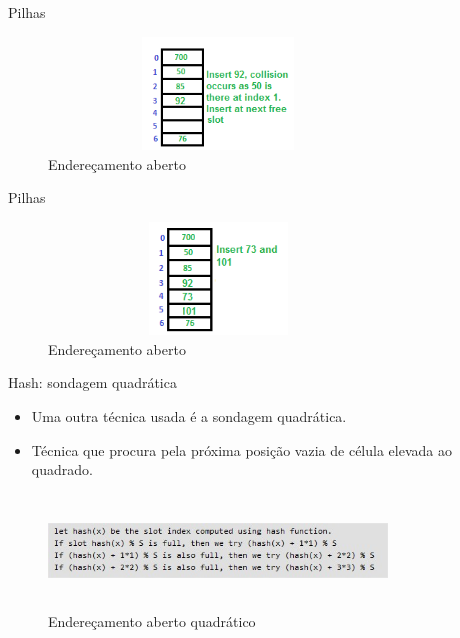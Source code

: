 \begin{frame}
	\begin{block}{Pilhas}
		\begin{figure}[!htb]
			\centering	  				
			\includegraphics[height=3cm, width = 9cm]{./pic/openAddressing15Linear.png}
			\caption{Endereçamento aberto}
			\label{fig_pilha}
		\end{figure}
	\end{block}
\end{frame}

\begin{frame}
	\begin{block}{Pilhas}
		\begin{figure}[!htb]
			\centering	  				
			\includegraphics[height=3cm, width = 9cm]{./pic/openAddressing16Linear.png}
			\caption{Endereçamento aberto}
			\label{fig_pilha}
		\end{figure}
	\end{block}
\end{frame}

\begin{frame}
	\begin{block}{Hash: sondagem quadrática}
		\begin{itemize}
			\item Uma outra técnica usada é a sondagem quadrática. 

			\item Técnica que procura pela próxima posição vazia de célula elevada ao quadrado.
		\end{itemize}
				\begin{figure}[!htb]
			\centering	  				
			\includegraphics[height=3cm, width = 9cm]{./pic/quadratic.jpg}
			\caption{Endereçamento aberto quadrático}
			\label{fig_pilha}
		\end{figure}
	\end{block}
\end{frame}

